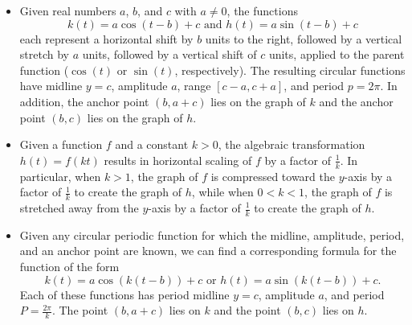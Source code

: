 \documentclass{ximera}
\begin{document}
\begin{summary}
\begin{itemize}[label=\textbullet]
\item
Given real numbers \(a\), \(b\), and \(c\) with \(a \ne 0\), the functions%
\begin{equation*}
k(t) = a\cos(t-b)+c \text{ and } h(t) = a\sin(t-b) + c
\end{equation*}
each represent a horizontal shift by \(b\) units to the right, followed by a vertical stretch by \(a\) units, followed by a vertical shift of \(c\) units, applied to the parent function (\(\cos(t)\) or \(\sin(t)\), respectively).  The resulting circular functions have midline \(y = c\), amplitude \(a\), range \([c-a,c+a]\), and period \(p = 2\pi\).  In addition, the anchor point \((b,a+c)\) lies on the graph of \(k\) and the anchor point \((b,c)\) lies on the graph of \(h\).%
\item
Given a function \(f\) and a constant \(k \gt 0\), the algebraic transformation \(h(t) = f(kt)\) results in horizontal scaling of \(f\) by a factor of \(\frac{1}{k}\).  In particular, when \(k \gt 1\), the graph of \(f\) is compressed toward the \(y\)-axis by a factor of \(\frac{1}{k}\) to create the graph of \(h\), while when \(0 \lt k \lt 1\), the graph of \(f\) is stretched away from the \(y\)-axis by a factor of \(\frac{1}{k}\) to create the graph of \(h\).%
\item
Given any circular periodic function for which the midline, amplitude, period, and an anchor point are known, we can find a corresponding formula for the function of the form%
\begin{equation*}
k(t) = a\cos(k(t-b))+c \text{ or } h(t) = a\sin(k(t-b)) + c\text{.}
\end{equation*}
Each of these functions has period midline \(y = c\), amplitude \(a\), and period \(P = \frac{2\pi}{k}\).  The point \((b,a+c)\) lies on \(k\) and the point \((b,c)\) lies on \(h\).%
\end{itemize}
\end{summary}
%
%
\end{document}

